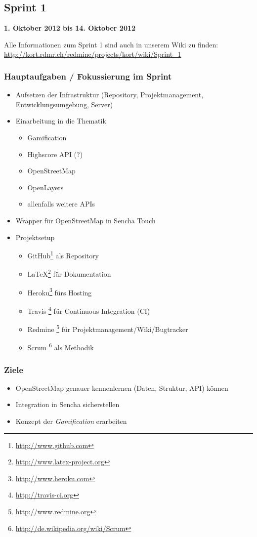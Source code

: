 \subsection{Sprint 1}

\textbf{1. Oktober 2012 bis 14. Oktober 2012}

Alle Informationen zum Sprint 1 sind auch in unserem Wiki zu finden:
\url{http://kort.rdmr.ch/redmine/projects/kort/wiki/Sprint_1}

\subsubsection{Hauptaufgaben / Fokussierung im Sprint}

\begin{itemize}
	\item Aufsetzen der Infrastruktur (Repository, Projektmanagement, Entwicklungsumgebung, Server)
	\item Einarbeitung in die Thematik
	\begin{itemize}
		\item Gamification
		\item Highscore API (?)
		\item \gls{OpenStreetMap}
		\item OpenLayers
		\item allenfalls weitere \gls{API}s
	\end{itemize}
	\item Wrapper für \gls{OpenStreetMap} in Sencha Touch
	\item Projektsetup
	\begin{itemize}
		\item GitHub\footnote{\url{http://www.github.com}} als Repository
		\item \LaTeX{}\footnote{\url{http://www.latex-project.org}} für Dokumentation
		\item Heroku\footnote{\url{http://www.heroku.com}} fürs Hosting
		\item Travis \footnote{\url{http://travis-ci.org}} für Continuous Integration (CI)
		\item Redmine \footnote{\url{http://www.redmine.org}} für Projektmanagement/Wiki/Bugtracker
		\item Scrum \footnote{\url{http://de.wikipedia.org/wiki/Scrum}} als Methodik
	\end{itemize}
\end{itemize}

\subsubsection{Ziele}
\begin{itemize}
	\item \gls{OpenStreetMap} genauer kennenlernen (Daten, Struktur, \gls{API}) können
	\item Integration in Sencha sicherstellen
	\item Konzept der \emph{Gamification} erarbeiten
\end{itemize}

